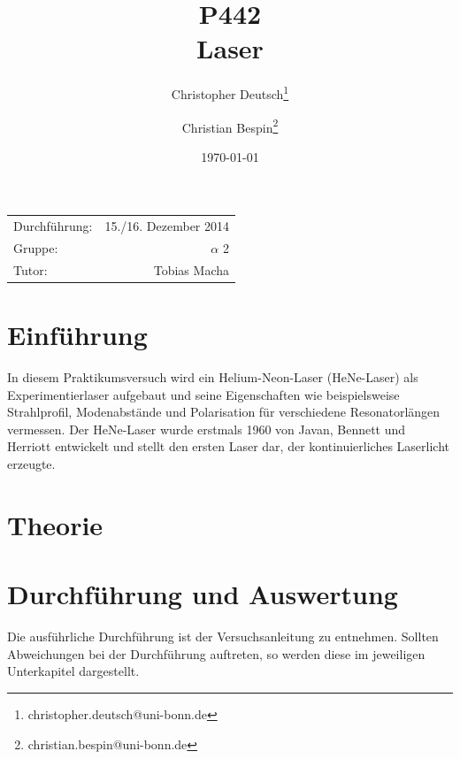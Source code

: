 \documentclass[11pt, a4paper]{article}
\title{P442 \\ Laser}
\author{Christopher Deutsch\footnote{christopher.deutsch@uni-bonn.de} \and Christian Bespin\footnote{christian.bespin@uni-bonn.de}}
\date{\today}
\numberwithin{equation}{section}
\begin{document}
\begin{titlepage}

\maketitle

\begin{center}
\begin{tabular}{l r}
Durchführung: & 15./16. Dezember 2014 \\
Gruppe: & $\alpha$ 2 \\
Tutor: & Tobias Macha
\end{tabular}
\end{center}

\begin{abstract}
\noindent

\end{abstract}

\end{titlepage}

\tableofcontents
\newpage


\section{Einführung}

In diesem Praktikumsversuch wird ein Helium-Neon-Laser (HeNe-Laser) als Experimentierlaser aufgebaut und seine Eigenschaften wie beispielsweise Strahlprofil, Modenabstände und Polarisation für verschiedene Resonatorlängen vermessen.
Der HeNe-Laser wurde erstmals 1960 von Javan, Bennett und Herriott \cite{javan} entwickelt und stellt den ersten Laser dar, der kontinuierliches Laserlicht erzeugte.

\section{Theorie}

\section{Durchführung und Auswertung}
Die ausführliche Durchführung ist der Versuchsanleitung \cite{anleitung} zu entnehmen.
Sollten Abweichungen bei der Durchführung auftreten, so werden diese im jeweiligen Unterkapitel dargestellt.
\end{document}
